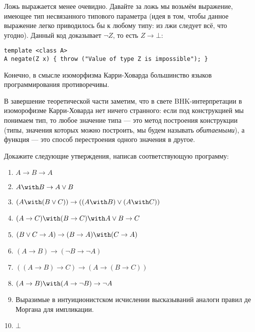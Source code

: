 \documentclass[10pt,a4paper,oneside]{article}
\begin{document}
\begin{enumerate}
Ложь выражается менее очевидно. Давайте за ложь мы возьмём выражение, имеющее тип несвязанного типового параметра
(идея в том, чтобы данное выражение легко приводилось бы к любому типу: из лжи следует всё, что угодно). 
Данный код доказывает $\neg Z$, то есть $Z \rightarrow \bot$: 
\begin{verbatim}
template <class A>   
A negate(Z x) { throw ("Value of type Z is impossible"); }
\end{verbatim}

Конечно, в смысле изоморфизма Карри-Ховарда большинство языков программирования противоречивы.

В завершение теоретической части заметим, что в свете BHK-интерпретации в изоморофизме Карри-Ховарда нет
ничего странного: если под конструкцией мы понимаем тип, то любое значение типа --- это метод построения конструкции
(типы, значения которых можно построить, мы будем называть \emph{обитаемыми}), 
а функция --- это способ перестроения одного значения в другое.

Докажите следующие утверждения, написав соответствующую программу:
\begin{enumerate}
\item $A \rightarrow B \rightarrow A$
\item $A \with B \rightarrow A \vee B$
\item $(A \with (B \vee C)) \rightarrow ((A \with B) \vee (A \with C))$
\item $(A \rightarrow C) \with (B \rightarrow C) \with A \vee B \rightarrow C$
\item $(B \vee C \rightarrow A) \rightarrow (B \rightarrow A) \with (C \rightarrow A)$
\item $(A \rightarrow B) \rightarrow (\neg B \rightarrow \neg A)$
\item $((A \rightarrow B) \rightarrow C) \rightarrow (A \rightarrow (B \rightarrow C))$
\item $(A \rightarrow B) \with (A \rightarrow \neg B) \rightarrow \neg A$
\item Выразимые в интуиционистском исчислении высказываний аналоги правил де Моргана для импликации.
\item $\bot$
\end{enumerate}


\end{enumerate}
\end{document}
